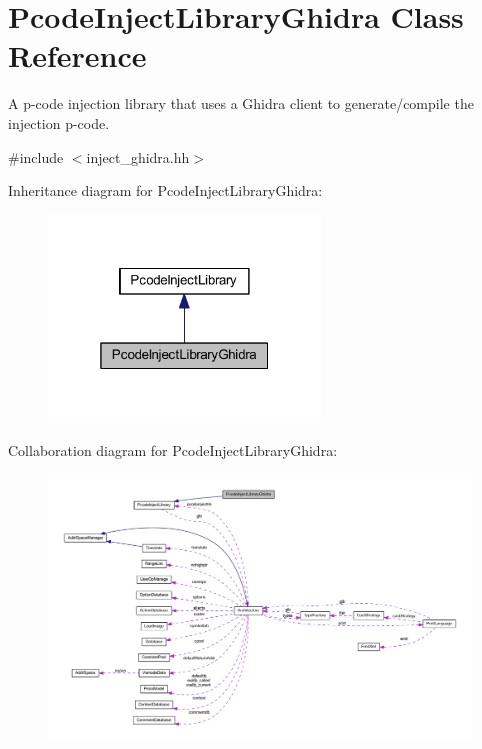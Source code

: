 \hypertarget{class_pcode_inject_library_ghidra}{}\section{Pcode\+Inject\+Library\+Ghidra Class Reference}
\label{class_pcode_inject_library_ghidra}


A p-\/code injection library that uses a Ghidra client to generate/compile the injection p-\/code.  




{\ttfamily \#include $<$inject\+\_\+ghidra.\+hh$>$}



Inheritance diagram for Pcode\+Inject\+Library\+Ghidra\+:
\nopagebreak
\begin{figure}[H]
\begin{center}
\leavevmode
\includegraphics[width=205pt]{class_pcode_inject_library_ghidra__inherit__graph}
\end{center}
\end{figure}


Collaboration diagram for Pcode\+Inject\+Library\+Ghidra\+:
\nopagebreak
\begin{figure}[H]
\begin{center}
\leavevmode
\includegraphics[width=350pt]{class_pcode_inject_library_ghidra__coll__graph}
\end{center}
\end{figure}
